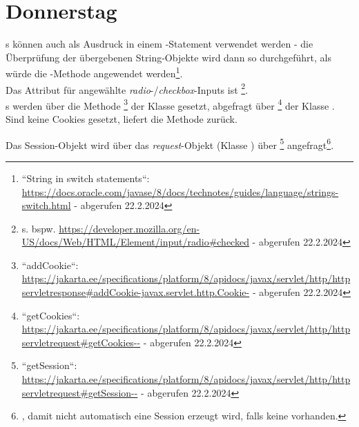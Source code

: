 \section{Donnerstag}

s können auch als Ausdruck in einem -Statement verwendet werden - die Überprüfung der übergebenen String-Objekte wird dann so durchgeführt, als würde die -Methode angewendet werden\footnote{``String in switch statements``: \url{https://docs.oracle.com/javase/8/docs/technotes/guides/language/strings-switch.html} - abgerufen 22.2.2024
}.\\


\noindent
Das Attribut für angewählte \textit{radio}-/\textit{checkbox}-Inputs ist \footnote{
s. bspw. \url{https://developer.mozilla.org/en-US/docs/Web/HTML/Element/input/radio#checked} - abgerufen 22.2.2024
}.\\

\noindent
{}s werden über die Methode \footnote{
``addCookie``: \url{https://jakarta.ee/specifications/platform/8/apidocs/javax/servlet/http/httpservletresponse#addCookie-javax.servlet.http.Cookie-} - abgerufen 22.2.2024
} der Klasse  gesetzt, abgefragt über \footnote{
``getCookies``: \url{https://jakarta.ee/specifications/platform/8/apidocs/javax/servlet/http/httpservletrequest#getCookies--} - abgerufen 22.2.2024
} der Klasse .
Sind keine Cookies gesetzt, liefert die Methode  zurück.


\noindent
Das Session-Objekt wird über das \textit{request}-Objekt (Klasse ) über \footnote{
``getSession``: \url{https://jakarta.ee/specifications/platform/8/apidocs/javax/servlet/http/httpservletrequest#getSession--} - abgerufen 22.2.2024
} angefragt\footnote{, damit nicht automatisch eine Session erzeugt wird, falls keine vorhanden.}.
